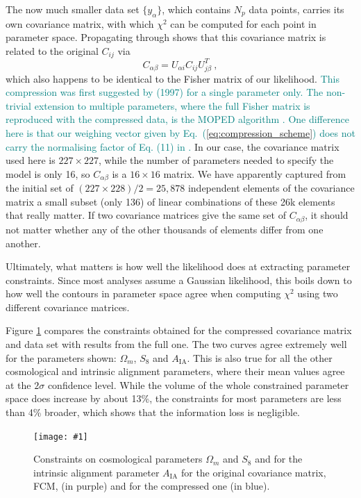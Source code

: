 \documentclass[twocolumn]{\docclass}
\newcommand{\sfig}[2]{
	\texttt{[image: \#1]}
}
\newcommand{\Sfig}[2]{
	\begin{figure}[thbp]
		\sfig{../figures/#1.pdf}{\columnwidth}
		\caption{{\small #2}}
		\label{fig:#1}
	\end{figure}
}
\newcommand{\rf}[1]{Figure \ref{fig:#1}}
\newcommand{\ec}[1]{Eq.~(\ref{eq:#1})}
\newcommand\be{\begin{equation}}
\newcommand\ee{\end{equation}}
\newcommand\full{FCM}
\begin{document}
	The now much smaller data set $\{y_\alpha\}$, which contains $N_p$ data points, carries its own covariance matrix, with which $\chi^2$ can be computed for each point in parameter space. Propagating through shows that this covariance matrix is related to the original $C_{ij}$ via
	\be
	C_{\alpha\beta} = U_{\alpha i} C_{ij} U^T_{j\beta}\ 
	,\ee
	which also happens to be identical to the Fisher matrix of our likelihood. \textcolor{teal}{This compression was first suggested by \citeauthor{Tegmark:1997maa} (1997) for a single parameter only.  The non-trivial extension to multiple parameters, where the full Fisher matrix is reproduced with the compressed data, is the MOPED algorithm \citep{Heavens:2000hjl}. One difference here is that our weighing vector given by \ec{compression_scheme} does not carry the normalising factor of Eq. (11) in \citep{Heavens:2000hjl}.} In our case, the covariance matrix used here is  $227 \times 227$, while the number of parameters needed to specify the model is only 16, so $C_{\alpha\beta}$ is a $16\times 16$ matrix. We have apparently captured from the initial set of $(227 \times 228)/2 = 25,878$ independent elements of the covariance matrix a small subset (only 136) of linear combinations of these 26k elements that really matter. If two covariance matrices give the same set of $C_{\alpha\beta}$, it should not matter whether any of the other thousands of elements differ from one another.
	
	Ultimately, what matters is how well the likelihood does at extracting parameter constraints. Since most analyses assume a Gaussian likelihood, this boils down to how well the contours in parameter space agree when computing $\chi^2$ using two different covariance matrices.	
	
	\rf{Comp2pt-constraints_wmS8A} compares the constraints obtained for the compressed covariance matrix and data set with results from the full one. The two curves agree extremely well for the parameters shown: $\Omega_m$, $S_8$ and $A_{\mathrm{IA}}$. This is also true for all the other cosmological and intrinsic alignment parameters, where their mean values agree at the $2 \sigma$ confidence level. While the volume of the whole constrained parameter space does increase by about 13\%, the constraints for most parameters are less than 4\% broader, which shows that the information loss is negligible. 
	
	\Sfig{Comp2pt-constraints_wmS8A}{Constraints on cosmological parameters $\Omega_m$ and $S_8$ and for the intrinsic alignment parameter $A_{\mathrm{IA}}$ for the original covariance matrix, \full, (in purple) and for the compressed one (in blue).}
	
\end{document}
